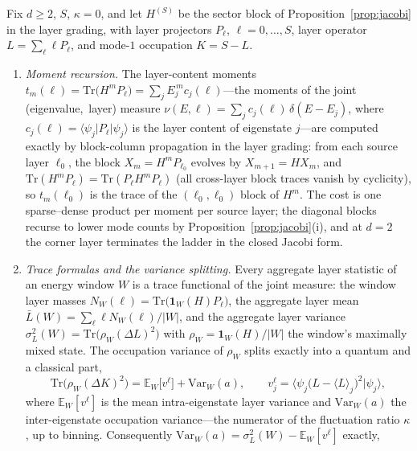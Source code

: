 \begin{proposition}\label{prop:moments}
Fix $d\ge2$, $S$, $\kappa=0$, and let $H^{(S)}$ be the sector block of
Proposition~\ref{prop:jacobi} in the layer grading, with layer projectors
$P_{\ell}$, $\ell=0,\dots,S$, layer operator $L=\sum_{\ell}\ell
P_{\ell}$, and mode-$1$ occupation $K=S-L$.
\begin{enumerate}[leftmargin=1.6em]
\item \emph{Moment recursion.} The layer-content moments
$t_m(\ell)=\mathrm{Tr}\bigl(H^{m}P_{\ell}\bigr)
=\sum_j E_j^{\,m}c_j(\ell)$---the moments of the joint
(eigenvalue,~layer) measure
$\nu(E,\ell)=\sum_j c_j(\ell)\,\delta(E-E_j)$, where
$c_j(\ell)=\langle\psi_j|P_{\ell}|\psi_j\rangle$ is the layer content of
eigenstate $j$---are computed exactly by block-column propagation in the
layer grading: from each source layer $\ell_0$, the block
$X_m=H^{m}P_{\ell_0}$ evolves by $X_{m+1}=HX_m$, and
$\mathrm{Tr}(H^{m}P_{\ell})=\mathrm{Tr}(P_{\ell}H^{m}P_{\ell})$ (all
cross-layer block traces vanish by cyclicity), so $t_m(\ell_0)$ is the
trace of the $(\ell_0,\ell_0)$ block of $H^{m}$. The cost is one
sparse--dense product per moment per source layer; the diagonal blocks
recurse to lower mode counts by Proposition~\ref{prop:jacobi}(i), and at
$d=2$ the corner layer terminates the ladder in the closed Jacobi form.
\item \emph{Trace formulas and the variance splitting.} Every aggregate
layer statistic of an energy window $W$ is a trace functional of the joint
measure: the window layer masses
$N_{W}(\ell)=\mathrm{Tr}\bigl(\mathbf{1}_{W}(H)P_{\ell}\bigr)$, the
aggregate layer mean $\bar L(W)=\sum_{\ell}\ell N_{W}(\ell)/|W|$, and the
aggregate layer variance
$\sigma_L^{2}(W)=\mathrm{Tr}\bigl(\rho_W(\Delta L)^{2}\bigr)$ with
$\rho_W=\mathbf{1}_{W}(H)/|W|$ the window's maximally mixed state. The
occupation variance of $\rho_W$ splits exactly into a quantum and a
classical part,
\begin{equation*}
\mathrm{Tr}\bigl(\rho_W(\Delta K)^{2}\bigr)
=\mathbb{E}_{W}\bigl[v^{\ell}\bigr]+\mathrm{Var}_{W}(a),
\qquad
v^{\ell}_j=\bigl\langle\psi_j\bigl(L-\langle L\rangle_j\bigr)^{2}
\bigr|\psi_j\bigr\rangle,
\end{equation*}
where $\mathbb{E}_W[v^{\ell}]$ is the mean intra-eigenstate layer variance
and $\mathrm{Var}_{W}(a)$ the inter-eigenstate occupation variance---the
numerator of the fluctuation ratio $\kappa$, up to binning. Consequently
$\mathrm{Var}_{W}(a)=\sigma_L^{2}(W)-\mathbb{E}_{W}[v^{\ell}]$ exactly,

\end{enumerate}
\end{proposition}
